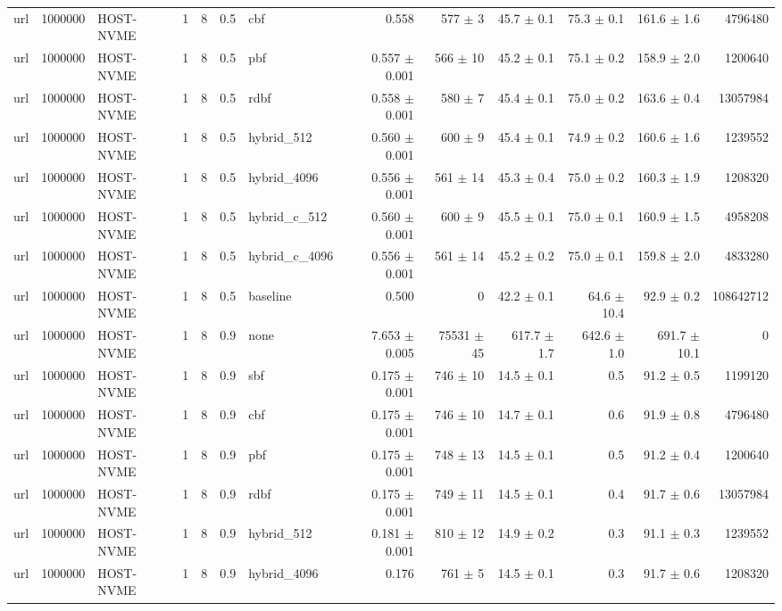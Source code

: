 \begin{tabular}{lllllllrrrrrr}
url & 1000000 & HOST-NVME & 1 & 8 & 0.5 & cbf & 0.558 & 577 $\pm$ 3 & 45.7 $\pm$ 0.1 & 75.3 $\pm$ 0.1 & 161.6 $\pm$ 1.6 & 4796480 \\
url & 1000000 & HOST-NVME & 1 & 8 & 0.5 & pbf & 0.557 $\pm$ 0.001 & 566 $\pm$ 10 & 45.2 $\pm$ 0.1 & 75.1 $\pm$ 0.2 & 158.9 $\pm$ 2.0 & 1200640 \\
url & 1000000 & HOST-NVME & 1 & 8 & 0.5 & rdbf & 0.558 $\pm$ 0.001 & 580 $\pm$ 7 & 45.4 $\pm$ 0.1 & 75.0 $\pm$ 0.2 & 163.6 $\pm$ 0.4 & 13057984 \\
url & 1000000 & HOST-NVME & 1 & 8 & 0.5 & hybrid\_512 & 0.560 $\pm$ 0.001 & 600 $\pm$ 9 & 45.4 $\pm$ 0.1 & 74.9 $\pm$ 0.2 & 160.6 $\pm$ 1.6 & 1239552 \\
url & 1000000 & HOST-NVME & 1 & 8 & 0.5 & hybrid\_4096 & 0.556 $\pm$ 0.001 & 561 $\pm$ 14 & 45.3 $\pm$ 0.4 & 75.0 $\pm$ 0.2 & 160.3 $\pm$ 1.9 & 1208320 \\
url & 1000000 & HOST-NVME & 1 & 8 & 0.5 & hybrid\_c\_512 & 0.560 $\pm$ 0.001 & 600 $\pm$ 9 & 45.5 $\pm$ 0.1 & 75.0 $\pm$ 0.1 & 160.9 $\pm$ 1.5 & 4958208 \\
url & 1000000 & HOST-NVME & 1 & 8 & 0.5 & hybrid\_c\_4096 & 0.556 $\pm$ 0.001 & 561 $\pm$ 14 & 45.2 $\pm$ 0.2 & 75.0 $\pm$ 0.1 & 159.8 $\pm$ 2.0 & 4833280 \\
url & 1000000 & HOST-NVME & 1 & 8 & 0.5 & baseline & 0.500 & 0 & 42.2 $\pm$ 0.1 & 64.6 $\pm$ 10.4 & 92.9 $\pm$ 0.2 & 108642712 \\
url & 1000000 & HOST-NVME & 1 & 8 & 0.9 & none & 7.653 $\pm$ 0.005 & 75531 $\pm$ 45 & 617.7 $\pm$ 1.7 & 642.6 $\pm$ 1.0 & 691.7 $\pm$ 10.1 & 0 \\
url & 1000000 & HOST-NVME & 1 & 8 & 0.9 & sbf & 0.175 $\pm$ 0.001 & 746 $\pm$ 10 & 14.5 $\pm$ 0.1 & 0.5 & 91.2 $\pm$ 0.5 & 1199120 \\
url & 1000000 & HOST-NVME & 1 & 8 & 0.9 & cbf & 0.175 $\pm$ 0.001 & 746 $\pm$ 10 & 14.7 $\pm$ 0.1 & 0.6 & 91.9 $\pm$ 0.8 & 4796480 \\
url & 1000000 & HOST-NVME & 1 & 8 & 0.9 & pbf & 0.175 $\pm$ 0.001 & 748 $\pm$ 13 & 14.5 $\pm$ 0.1 & 0.5 & 91.2 $\pm$ 0.4 & 1200640 \\
url & 1000000 & HOST-NVME & 1 & 8 & 0.9 & rdbf & 0.175 $\pm$ 0.001 & 749 $\pm$ 11 & 14.5 $\pm$ 0.1 & 0.4 & 91.7 $\pm$ 0.6 & 13057984 \\
url & 1000000 & HOST-NVME & 1 & 8 & 0.9 & hybrid\_512 & 0.181 $\pm$ 0.001 & 810 $\pm$ 12 & 14.9 $\pm$ 0.2 & 0.3 & 91.1 $\pm$ 0.3 & 1239552 \\
url & 1000000 & HOST-NVME & 1 & 8 & 0.9 & hybrid\_4096 & 0.176 & 761 $\pm$ 5 & 14.5 $\pm$ 0.1 & 0.3 & 91.7 $\pm$ 0.6 & 1208320 \\

\end{tabular}
